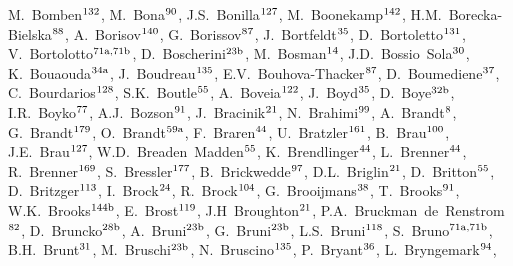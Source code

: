 \begin{flushleft}
M.~Bomben$^\textrm{\scriptsize 132}$,    
M.~Bona$^\textrm{\scriptsize 90}$,    
J.S.~Bonilla$^\textrm{\scriptsize 127}$,    
M.~Boonekamp$^\textrm{\scriptsize 142}$,    
H.M.~Borecka-Bielska$^\textrm{\scriptsize 88}$,    
A.~Borisov$^\textrm{\scriptsize 140}$,    
G.~Borissov$^\textrm{\scriptsize 87}$,    
J.~Bortfeldt$^\textrm{\scriptsize 35}$,    
D.~Bortoletto$^\textrm{\scriptsize 131}$,    
V.~Bortolotto$^\textrm{\scriptsize 71a,71b}$,    
D.~Boscherini$^\textrm{\scriptsize 23b}$,    
M.~Bosman$^\textrm{\scriptsize 14}$,    
J.D.~Bossio~Sola$^\textrm{\scriptsize 30}$,    
K.~Bouaouda$^\textrm{\scriptsize 34a}$,    
J.~Boudreau$^\textrm{\scriptsize 135}$,    
E.V.~Bouhova-Thacker$^\textrm{\scriptsize 87}$,    
D.~Boumediene$^\textrm{\scriptsize 37}$,    
C.~Bourdarios$^\textrm{\scriptsize 128}$,    
S.K.~Boutle$^\textrm{\scriptsize 55}$,    
A.~Boveia$^\textrm{\scriptsize 122}$,    
J.~Boyd$^\textrm{\scriptsize 35}$,    
D.~Boye$^\textrm{\scriptsize 32b}$,    
I.R.~Boyko$^\textrm{\scriptsize 77}$,    
A.J.~Bozson$^\textrm{\scriptsize 91}$,    
J.~Bracinik$^\textrm{\scriptsize 21}$,    
N.~Brahimi$^\textrm{\scriptsize 99}$,    
A.~Brandt$^\textrm{\scriptsize 8}$,    
G.~Brandt$^\textrm{\scriptsize 179}$,    
O.~Brandt$^\textrm{\scriptsize 59a}$,    
F.~Braren$^\textrm{\scriptsize 44}$,    
U.~Bratzler$^\textrm{\scriptsize 161}$,    
B.~Brau$^\textrm{\scriptsize 100}$,    
J.E.~Brau$^\textrm{\scriptsize 127}$,    
W.D.~Breaden~Madden$^\textrm{\scriptsize 55}$,    
K.~Brendlinger$^\textrm{\scriptsize 44}$,    
L.~Brenner$^\textrm{\scriptsize 44}$,    
R.~Brenner$^\textrm{\scriptsize 169}$,    
S.~Bressler$^\textrm{\scriptsize 177}$,    
B.~Brickwedde$^\textrm{\scriptsize 97}$,    
D.L.~Briglin$^\textrm{\scriptsize 21}$,    
D.~Britton$^\textrm{\scriptsize 55}$,    
D.~Britzger$^\textrm{\scriptsize 113}$,    
I.~Brock$^\textrm{\scriptsize 24}$,    
R.~Brock$^\textrm{\scriptsize 104}$,    
G.~Brooijmans$^\textrm{\scriptsize 38}$,    
T.~Brooks$^\textrm{\scriptsize 91}$,    
W.K.~Brooks$^\textrm{\scriptsize 144b}$,    
E.~Brost$^\textrm{\scriptsize 119}$,    
J.H~Broughton$^\textrm{\scriptsize 21}$,    
P.A.~Bruckman~de~Renstrom$^\textrm{\scriptsize 82}$,    
D.~Bruncko$^\textrm{\scriptsize 28b}$,    
A.~Bruni$^\textrm{\scriptsize 23b}$,    
G.~Bruni$^\textrm{\scriptsize 23b}$,    
L.S.~Bruni$^\textrm{\scriptsize 118}$,    
S.~Bruno$^\textrm{\scriptsize 71a,71b}$,    
B.H.~Brunt$^\textrm{\scriptsize 31}$,    
M.~Bruschi$^\textrm{\scriptsize 23b}$,    
N.~Bruscino$^\textrm{\scriptsize 135}$,    
P.~Bryant$^\textrm{\scriptsize 36}$,    
L.~Bryngemark$^\textrm{\scriptsize 94}$,    

\end{flushleft}
